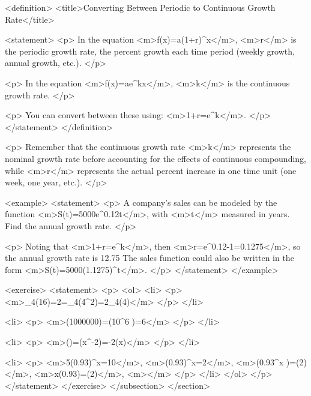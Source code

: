         <definition>
            <title>Converting Between Periodic to Continuous Growth Rate</title>

            <statement>
                <p>
                    In the equation <m>f(x)=a(1+r)^{x}</m>, <m>r</m> is the periodic growth rate, the percent growth each time period (weekly growth, annual growth, etc.).
                </p>

                <p>
                    In the equation <m>f(x)=ae^{kx}</m>, <m>k</m> is the continuous growth rate.
                </p>

                <p>
                    You can convert between these using: <m>1+r=e^{k}</m>.
                </p>
            </statement>
        </definition>

        <p>
            Remember that the continuous growth rate <m>k</m> represents the nominal growth rate before accounting for the effects of continuous compounding, while <m>r</m> represents the actual percent increase in one time unit (one week, one year, etc.).
        </p>

        <example>
            <statement>
                <p>
                    A company’s sales can be modeled by the function <m>S(t)=5000e^{0.12t}</m>, with <m>t</m> measured in years.
                    Find the annual growth rate.
                </p>

                <p>
                    Noting that <m>1+r=e^{k}</m>, then <m>r=e^{0.12}-1=0.1275</m>, so the annual growth rate is 12.75%
                    The sales function could also be written in the form <m>S(t)=5000(1.1275)^{t}</m>.
                </p>
            </statement>
        </example>

        <exercise>
            <statement>
                <p>
                    <ol>
                        <li>
                            <p>
                                <m>\log_{4}⁡(16)=2=\log_{4}⁡(4^{2})=2\log_{4}(⁡4)</m>
                            </p>
                        </li>

                        <li>
                            <p>
                                <m>\log⁡(1000000)=\log⁡(10^{6} )=6</m>
                            </p>
                        </li>

                        <li>
                            <p>
                                <m>\ln⁡()=\ln⁡(x^{-2})=-2\ln⁡(x)</m>
                            </p>
                        </li>

                        <li>
                            <p>
                                <m>5(0.93)^{x}=10</m>, <m>(0.93)^{x}=2</m>, <m>\ln⁡(0.93^{x} )=\ln⁡(2)</m>, <m>x\ln⁡(0.93)=\ln⁡(2)</m>, <m></m>
                            </p>
                        </li>
                    </ol>
                </p>
            </statement>
        </exercise>
    </subsection>
</section>
